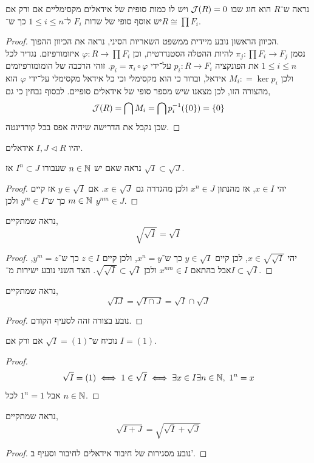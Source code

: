\subquestion{}
נראה ש־$R$ הוא חוג שבו $\mathcal{J}(R) = 0$ ויש לו כמות סופית של אידאלים מקסימליים אם ורק אם יש אוסף סופי של שדות $F_i$ ל־$1 \le i \le n$ כך ש־$R \cong \prod F_i$.
\begin{proof}
	הכיוון הראשון נובע מיידית ממשפט השאריות הסיני, נראה את הכיוון ההפוך. \\
	נסמן $\pi_j : \prod F_i \to F_j$ להיות ההטלה הסטנדרטית, וכן $\varphi : R \to \prod F_i$ איזומורפיזם.
	נגדיר לכל $1 \le i \le n$ את הפונקציה $p_i : R \to F_i$ על־ידי $p_i = \pi_i \circ \varphi$.
	זוהי הרכבה של הומומורפיזמים ולכן $M_i : = \ker p_i$ אידאל, וברור כי הוא מקסימלי וכי כל אידאל מקסימלי על־ידי $\varphi$ הוא מהצורה הזו, לכן מצאנו שיש מספר סופי של אידאלים סופיים.
	לבסוף נבחין כי גם,
	\[
		\mathcal{J}(R)
		= \bigcap M_i
		= \bigcap p_i^{-1}(\{ 0 \})
		= \{ 0 \}
	\]
	שכן נקבל את הדרישה שיהיה אפס בכל קורדינטה.
\end{proof}

\question{}
יהיו $I, J \triangleleft R$ אידאלים.

\subquestion{}
נראה שאם יש $n \in \mathbb{N}$ שעבורו $I^n \subset J$ אז $\sqrt{I} \subset \sqrt{J}$.
\begin{proof}
	יהי $x \in I$, אז מהנתון $x^n \in J$ ולכן מהגדרה גם $x \in \sqrt{J}$.
	אם $y \in \sqrt{I}$ אז קיים $m \in \mathbb{N}$ כך ש־$y^m \in I$ ולכן $y^{n m} \in J$.
\end{proof}

\subquestion{}
נראה שמתקיים,
\[
	\sqrt{\sqrt{I}}
	= \sqrt{I}
\]
\begin{proof}
	יהי $x \in \sqrt{\sqrt{I}}$, לכן קיים $y \in \sqrt{I}$ כך ש־$x^n = y$, ולכן קיים $z \in I$ כך ש־$y^m = z$, אבל בהתאם $x^{n m} \in I$ ולכן $\sqrt{\sqrt{I}} \subset \sqrt{I}$.
	הצד השני נובע ישירות מ־$I \subset \sqrt{I}$.
\end{proof}

\subquestion{}
נראה שמתקיים,
\[
	\sqrt{I J}
	= \sqrt{I \cap J}
	= \sqrt{I} \cap \sqrt{J}
\]
\begin{proof}
	נובע בצורה זהה לסעיף הקודם.
\end{proof}

\subquestion{}
נוכיח ש־$\sqrt{I} = (1)$ אם ורק אם $I = (1)$.
\begin{proof}
	\[
		\sqrt{I} = (1)
		\iff 1 \in \sqrt{I}
		\iff \exists x \in I \exists n \in \mathbb{N},\ 1^n = x
	\]
	אבל $1^n = 1$ לכל $n \in \mathbb{N}$.
\end{proof}

\subquestion{}
נראה שמתקיים,
\[
	\sqrt{I + J}
	= \sqrt{\sqrt{I} + \sqrt{J}}
\]
\begin{proof}
	נובע מסגירות של חיבור אידאלים לחיבור וסעיף ב'.
\end{proof}

